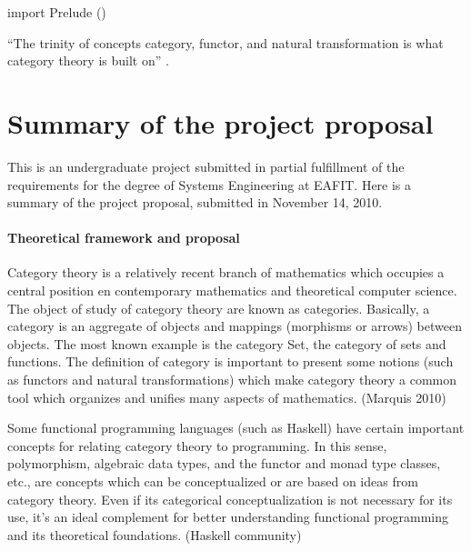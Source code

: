 

\begin{codehaskell}
import Prelude ()
\end{codehaskell}


``The trinity of concepts category, functor, and natural
transformation is what category theory is built on''
\parencite{nlab-category-theory}.

\section*{Summary of the project proposal}

This is an undergraduate project submitted in partial fulfillment of
the requirements for the degree of Systems Engineering at EAFIT. Here
is a summary of the project proposal, submitted in November 14, 2010.

\paragraph{Theoretical framework and proposal}

Category theory is a relatively recent branch of mathematics which
occupies a central position en contemporary mathematics and
theoretical computer science. The object of study of category theory
are known as categories. Basically, a category is an aggregate of
objects and mappings (morphisms or arrows) between objects. The most
known example is the category Set, the category of sets and functions.
The definition of category is important to present some notions (such
as functors and natural transformations) which make category theory a
common tool which organizes and unifies many aspects of mathematics.
(Marquis 2010)

Some functional programming languages (such as Haskell) have certain
important concepts for relating category theory to programming. In
this sense, polymorphism, algebraic data types, and the functor and
monad type classes, etc., are concepts which can be conceptualized or
are based on ideas from category theory. Even if its categorical
conceptualization is not necessary for its use, it's an ideal
complement for better understanding functional programming and its
theoretical foundations. (Haskell community)

